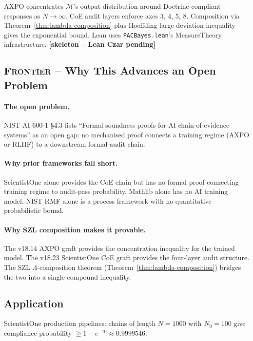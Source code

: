 AXPO concentrates $\mathcal{M}$'s output distribution around
Doctrine-compliant responses as $N \to \infty$.  CoE audit layers
enforce axes 3, 4, 5, 8.  Composition via
Theorem~\ref{thm:lambda-composition} plus Hoeffding large-deviation
inequality gives the exponential bound.  Lean uses
\texttt{PACBayes.lean}'s MeasureTheory infrastructure.
\hfill \textbf{[skeleton -- Lean Czar pending]}

\subsection*{\textsc{Frontier} -- Why This Advances an Open Problem}

\paragraph{The open problem.}
NIST AI 600-1 \S{}4.3 lists ``Formal soundness proofs for AI
chain-of-evidence systems'' as an open gap: no mechanised proof
connects a training regime (AXPO or RLHF) to a downstream
formal-audit chain.

\paragraph{Why prior frameworks fall short.}
ScientistOne alone provides the CoE chain but has no formal proof
connecting training regime to audit-pass probability.  Mathlib alone
has no AI training model.  NIST RMF alone is a process framework
with no quantitative probabilistic bound.

\paragraph{Why SZL composition makes it provable.}
The v18.14 AXPO graft provides the concentration inequality for the
trained model.  The v18.23 ScientistOne CoE graft provides the
four-layer audit structure.  The SZL \(\Lambda\)-composition theorem
(Theorem~\ref{thm:lambda-composition}) bridges the two into a single
compound inequality.

\subsection*{Application}

ScientistOne production pipelines: chains of length $N = 1000$ with
$N_0 = 100$ give compliance probability $\geq 1 - e^{-10} \approx
0.9999546$.

